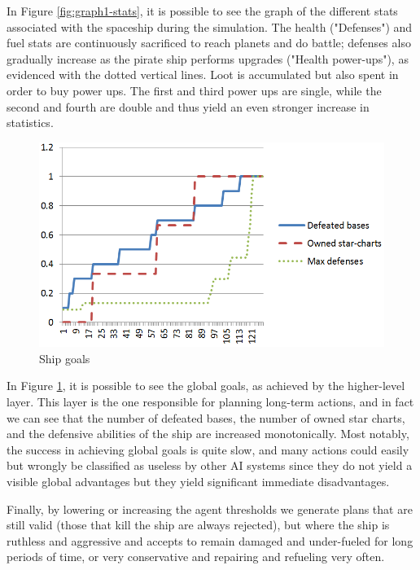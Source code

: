 In Figure \ref{fig:graph1-stats}, it is possible to see the graph of the different stats associated with the spaceship during the simulation. The health ("Defenses") and fuel stats are continuously sacrificed to reach planets and do battle; defenses also gradually increase as the pirate ship performs upgrades ("Health power-ups"), as evidenced with the dotted vertical lines. Loot is accumulated but also spent in order to buy power ups. The first and third power ups are single, while the second and fourth are double and thus yield an even stronger increase in statistics.

\begin{figure}
\begin{center}
\includegraphics[scale=0.3]{Pics/graph2-goals.png}
\end{center}
\caption{Ship goals}
\label{fig:graph2-goals}
\end{figure}  
  
In Figure \ref{fig:graph2-goals}, it is possible to see the global goals, as achieved by the higher-level layer. This layer is the one responsible for planning long-term actions, and in fact we can see that the number of defeated bases, the number of owned star charts, and the defensive abilities of the ship are increased monotonically. Most notably, the success in achieving global goals is quite slow, and many actions could easily but wrongly be classified as useless by other AI systems since they do not yield a visible global advantages but they yield significant immediate disadvantages.

Finally, by lowering or increasing the agent thresholds we generate plans that are still valid (those that kill the ship are always rejected), but where the ship is ruthless and aggressive and accepts to remain damaged and under-fueled for long periods of time, or very conservative and repairing and refueling very often.

